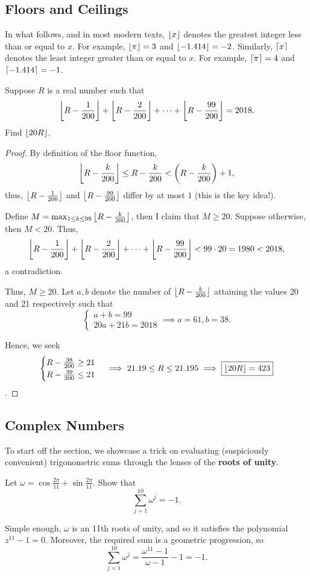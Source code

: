 \documentclass[../main.tex]{subfiles}
\begin{document}
\subsection{Floors and Ceilings}
In what follows, and in most modern texts, $\left\lfloor x \right\rfloor$ denotes the greatest integer less than or equal to $x$. For example, $\left\lfloor \pi \right\rfloor=3$ and $\left\lfloor -1.414 \right\rfloor=-2$. 
Similarly, $\left\lceil x \right\rceil$ denotes the least integer greater than or equal to $x$. For example, $\left\lceil \pi \right\rceil=4$ and $\left\lceil -1.414 \right\rceil=-1$.
\begin{example}[2018 SMO(S) P25]
    Suppose $R$ is a real number such that
    $$\left\lfloor R-\frac{1}{200} \right\rfloor+\left\lfloor R-\frac{2}{200} \right\rfloor+\cdots+\left\lfloor R-\frac{99}{200} \right\rfloor=2018.$$
    Find $\left\lfloor 20R \right\rfloor$.
\end{example}
\begin{proof}
    By definition of the floor function,
    $$\left\lfloor R-\frac{k}{200} \right\rfloor\leq R-\frac{k}{200} < \left(R-\frac{k}{200}\right)+1,$$ 
    thus, $\left\lfloor R-\frac{1}{200} \right\rfloor$ and $\left\lfloor R-\frac{99}{200} \right\rfloor$ differ by at most $1$ (this is the key idea!). 
    
    Define $M=\max_{1\leq k\leq 99}\left\lfloor R-\frac{k}{200} \right\rfloor$, then I claim that $M\geq 20$. Suppose otherwise, then $M < 20$. Thus, 
    $$\left\lfloor R-\frac{1}{200} \right\rfloor+\left\lfloor R-\frac{2}{200} \right\rfloor+\cdots+\left\lfloor R-\frac{99}{200} \right\rfloor < 99\cdot 20 = 1980 < 2018,$$
    a contradiction.

    Thus, $M \geq 20$. Let $a, b$ denote the number of $\left\lfloor R-\frac{k}{200} \right\rfloor$ attaining the values 20 and 21 respectively such that
    $$\begin{cases}
        a+b=99 \\
        20a+21b=2018
    \end{cases}
    \implies a=61, b=38.$$

    Hence, we seek 
    $$\begin{cases}
        R-\frac{38}{200} \geq 21 \\
        R-\frac{39}{200}\leq 21
    \end{cases}
    \implies 21.19 \leq R \leq 21.195 \implies \boxed{\left\lfloor 20R \right\rfloor=423}$$.
\end{proof}

\subsection{Complex Numbers}
To start off the section, we showcase a trick on evaluating (suspiciously convenient) trigonometric sums through the lenses of the \textbf{roots of unity}.
\begin{example}
Let $\omega=\cos{\frac{2\pi}{11}}+\sin{\frac{2\pi}{11}}$.
Show that $$\sum_{j=1}^{10} \omega^{j}=-1.$$
\end{example}
Simple enough, $\omega$ is an 11th roots of unity, and so it satisfies the polynomial $z^{11}-1=0$. Moreover, the required sum is a geometric progression, so
$$\sum_{j=1}^{10} \omega^{j}=\frac{\omega^{11}-1}{\omega-1}-1=-1.$$
\end{document}
